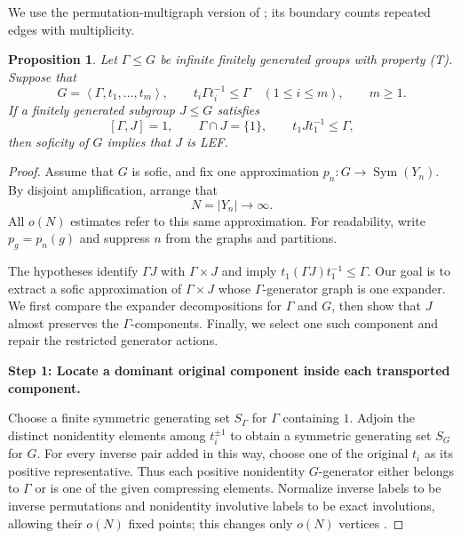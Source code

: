\documentclass[10pt]{article}
\newtheorem{proposition}[theorem]{Proposition}
\newcommand{\Sym}{\operatorname{Sym}}
\newcommand{\stephead}[1]{\par\medskip\noindent\textbf{#1}\par\smallskip}
\newcommand{\abs}[1]{\left|#1\right|}
\newcommand{\angles}[1]{\left\langle #1\right\rangle}
\begin{document}
We use the permutation-multigraph version of \cite[Theorem~1.1 and Section~4]{KT19}; its boundary counts repeated edges with multiplicity.

\begin{proposition}
Let $\Gamma\leq G$ be infinite finitely generated groups with property (T). Suppose that
\[
G=\angles{\Gamma,t_1,\ldots,t_m},\qquad t_i\Gamma t_i^{-1}\leq\Gamma\quad(1\leq i\leq m),\qquad m\geq1.
\]
If a finitely generated subgroup $J\leq G$ satisfies
\[
[\Gamma,J]=1,\qquad \Gamma\cap J=\{1\},\qquad t_1Jt_1^{-1}\leq\Gamma,
\]
then soficity of $G$ implies that $J$ is LEF.
\end{proposition}

\begin{proof}
Assume that $G$ is sofic, and fix one approximation $p_n:G\to\Sym(Y_n)$. By disjoint amplification, arrange that
\[
N=\abs{Y_n}\longrightarrow\infty.
\]
All $o(N)$ estimates refer to this same approximation. For readability, write $p_g=p_n(g)$ and suppress $n$ from the graphs and partitions.

The hypotheses identify $\Gamma J$ with $\Gamma\times J$ and imply $t_1(\Gamma J)t_1^{-1}\leq\Gamma$. Our goal is to extract a sofic approximation of $\Gamma\times J$ whose $\Gamma$-generator graph is one expander. We first compare the expander decompositions for $\Gamma$ and $G$, then show that $J$ almost preserves the $\Gamma$-components. Finally, we select one such component and repair the restricted generator actions.

\stephead{Step 1: Locate a dominant original component inside each transported component.}
Choose a finite symmetric generating set $S_\Gamma$ for $\Gamma$ containing $1$. Adjoin the distinct nonidentity elements among $t_i^{\pm1}$ to obtain a symmetric generating set $S_G$ for $G$. For every inverse pair added in this way, choose one of the original $t_i$ as its positive representative. Thus each positive nonidentity $G$-generator either belongs to $\Gamma$ or is one of the given compressing elements. Normalize inverse labels to be inverse permutations and nonidentity involutive labels to be exact involutions, allowing their $o(N)$ fixed points; this changes only $o(N)$ vertices \cite[Lemma~2.1]{ES06}.


\end{proof}
\end{document}
